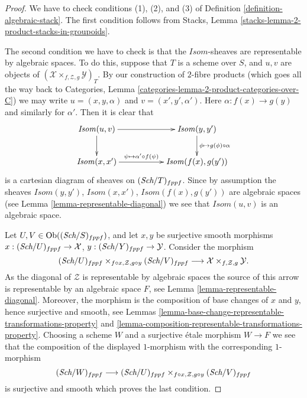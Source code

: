 \begin{proof}
We have to check conditions (1), (2), and (3) of
Definition \ref{definition-algebraic-stack}.
The first condition follows from
Stacks, Lemma \ref{stacks-lemma-2-product-stacks-in-groupoids}.

\medskip\noindent
The second condition we have to check is that the $\mathit{Isom}$-sheaves
are representable by algebraic spaces. To do this, suppose that
$T$ is a scheme over $S$, and $u, v$ are objects of
$(\mathcal{X} \times_{f, \mathcal{Z}, g} \mathcal{Y})_T$.
By our construction of $2$-fibre products (which goes all the way
back to
Categories, Lemma \ref{categories-lemma-2-product-categories-over-C})
we may write $u = (x, y, \alpha)$ and $v = (x', y', \alpha')$.
Here $\alpha : f(x) \to g(y)$ and similarly for $\alpha'$.
Then it is clear that
$$
\xymatrix{
\mathit{Isom}(u, v) \ar[d] \ar[rr] & &
\mathit{Isom}(y, y') \ar[d]^{\phi \mapsto g(\phi) \circ \alpha} \\
\mathit{Isom}(x, x') \ar[rr]^-{\psi \mapsto \alpha' \circ f(\psi)} & &
\mathit{Isom}(f(x), g(y'))
}
$$
is a cartesian diagram of sheaves on $(\textit{Sch}/T)_{fppf}$.
Since by assumption the sheaves
$\mathit{Isom}(y, y')$, $\mathit{Isom}(x, x')$, $\mathit{Isom}(f(x), g(y'))$
are algebraic spaces (see
Lemma \ref{lemma-representable-diagonal})
we see that $\mathit{Isom}(u, v)$
is an algebraic space.

\medskip\noindent
Let $U, V \in \text{Ob}((\textit{Sch}/S)_{fppf})$,
and let $x, y$ be surjective smooth morphisms
$x : (\textit{Sch}/U)_{fppf} \to \mathcal{X}$,
$y : (\textit{Sch}/Y)_{fppf} \to \mathcal{Y}$.
Consider the morphism
$$
(\textit{Sch}/U)_{fppf}
\times_{f \circ x, \mathcal{Z}, g \circ y}
(\textit{Sch}/V)_{fppf}
\longrightarrow
\mathcal{X} \times_{f, \mathcal{Z}, g} \mathcal{Y}.
$$
As the diagonal of $\mathcal{Z}$ is representable by algebraic spaces
the source of this arrow is representable by an algebraic space $F$, see
Lemma \ref{lemma-representable-diagonal}.
Moreover, the morphism is the composition
of base changes of $x$ and $y$, hence surjective and smooth, see
Lemmas \ref{lemma-base-change-representable-transformations-property} and
\ref{lemma-composition-representable-transformations-property}.
Choosing a scheme $W$ and a surjective \'etale morphism $W \to F$
we see that the composition of the displayed $1$-morphism
with the corresponding $1$-morphism
$$
(\textit{Sch}/W)_{fppf}
\longrightarrow
(\textit{Sch}/U)_{fppf}
\times_{f \circ x, \mathcal{Z}, g \circ y}
(\textit{Sch}/V)_{fppf}
$$
is surjective and smooth which proves the last condition.
\end{proof}

